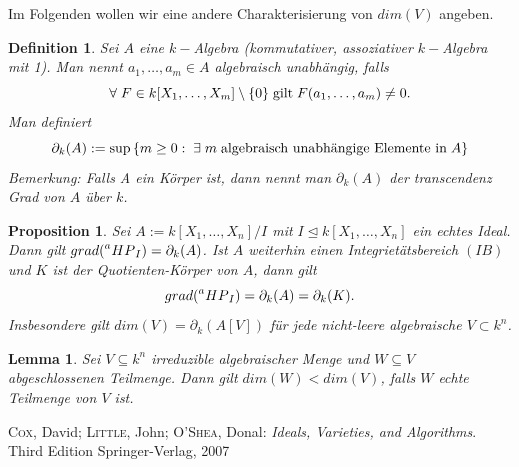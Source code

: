 \documentclass{article}
\newtheorem{definition}[satz]{Definition}
\newtheorem{lemma}[satz]{Lemma}
\newtheorem{proposition}[satz]{Proposition}
\newcommand*{\R}{k[X_{1},\ldots,X_{n}]}
\newcommand*{\indx}[2]{{#1}_{#2}}
\newcommand*{\hp}[1]{$\prescript{a}{}{HP}_{#1}$}
\begin{document}

Im Folgenden wollen wir eine andere Charakterisierung von $dim(V)$ angeben. 
\begin{definition}
	Sei $A$ eine $k-$Algebra (kommutativer, assoziativer $k-$Algebra mit 1). Man nennt $\indx{a}{1},\ldots,\indx{a}{m}\in A$ algebraisch unabhängig, falls 
	\begin{displaymath}
	\forall \;F\in k[\indx{X}{1},\ldots,\indx{X}{m}]\setminus\{0\} \;\textnormal{gilt}\; F(\indx{a}{1},\ldots,\indx{a}{m})\neq0.
	\end{displaymath}
	Man definiert
	\begin{displaymath}
	\indx{\partial}{k}(A):=\sup{\{m\geq0:\;\exists\; m \;\textnormal{algebraisch unabhängige Elemente in}\; A\}}
	\end{displaymath}
	Bemerkung: Falls A ein Körper ist, dann nennt man $\indx{\partial}{k}(A)$ der transcendenz Grad von $A$ über $k$.\\
\end{definition}


\begin{proposition}
	Sei $A:=\R/I$ mit $I\unlhd\R$ ein echtes Ideal. Dann gilt $grad(\textnormal{\hp{I}})=\indx{\partial}{k}(A)$. Ist $A$ weiterhin einen Integrietätsbereich $(IB)$ und $K$ ist der Quotienten-Körper von $A$, dann gilt
	\begin{displaymath}
	grad(\textnormal{\hp{I}})=\indx{\partial}{k}(A)=\indx{\partial}{k}(K).
	\end{displaymath}
	Insbesondere gilt $dim(V)=\indx{\partial}{k}(A[V])$ für jede nicht-leere algebraische $V\subset k^n$.\\
\end{proposition}


\begin{lemma}
	Sei $V\subseteq k^n$ irreduzible algebraischer Menge und $W\subseteq V$ abgeschlossenen Teilmenge. Dann gilt $dim(W)<dim(V)$, falls $W$ echte Teilmenge von $V$ ist.
\end{lemma} 


\begin{thebibliography}{99}
	\textsc{Cox}, David; \textsc{Little}, John; \textsc{O'Shea}, Donal:
	\newblock \emph{Ideals, Varieties, and Algorithms}.
	\newblock Third Edition
	\newblock Springer-Verlag, 2007
\end{thebibliography}
\end{document}
